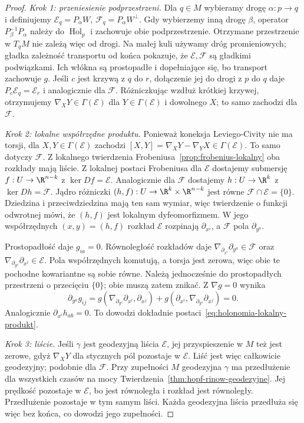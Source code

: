 \begin{proof}
\emph{Krok 1: przeniesienie podprzestrzeni.}
Dla $q\in M$ wybieramy drogę $\alpha:p\to q$ i
definiujemy $\mathcal E_q=P_\alpha W$,
$\mathcal F_q=P_\alpha W^\perp$. Gdy wybierzemy inną
drogę $\beta$, operator $P_\beta^{-1}P_\alpha$
należy do $\operatorname{Hol}_p$ i zachowuje obie
podprzestrzenie. Otrzymane przestrzenie w $T_qM$
nie zależą więc od drogi. Na małej kuli używamy dróg
promieniowych; gładka zależność transportu od końca
pokazuje, że $\mathcal E,\mathcal F$ są gładkimi
podwiązkami. Ich włókna są prostopadłe i dopełniające się,
bo transport zachowuje $g$. Jeśli $c$ jest krzywą
z $q$ do $r$, dołączenie jej do drogi z $p$ do $q$
daje $P_c\mathcal E_q=\mathcal E_r$ i analogicznie
dla $\mathcal F$. Różniczkując wzdłuż krótkiej krzywej,
otrzymujemy $\nabla_XY\in\Gamma(\mathcal E)$ dla
$Y\in\Gamma(\mathcal E)$ i dowolnego $X$; to samo
zachodzi dla $\mathcal F$.

\emph{Krok 2: lokalne współrzędne produktu.}
Ponieważ koneksja Leviego-Civity nie ma torsji,
dla $X,Y\in\Gamma(\mathcal E)$ zachodzi
$[X,Y]=\nabla_XY-\nabla_YX\in\Gamma(\mathcal E)$.
To samo dotyczy $\mathcal F$. Z lokalnego twierdzenia
Frobeniusa~\ref{prop:frobenius-lokalny} oba rozkłady
mają liście. Z lokalnej postaci Frobeniusa dla
$\mathcal E$ dostajemy submersję
$f:U\to\R^{n-k}$ z $\ker Df=\mathcal E$.
Analogicznie dla $\mathcal F$ dostajemy
$h:U\to\R^k$ z $\ker Dh=\mathcal F$.
Jądro różniczki $(h,f):U\to\R^k\times\R^{n-k}$
jest równe $\mathcal F\cap\mathcal E=\{0\}$.
Dziedzina i przeciwdziedzina mają ten sam wymiar,
więc twierdzenie o funkcji odwrotnej mówi, że $(h,f)$
jest lokalnym dyfeomorfizmem. W jego współrzędnych
$(x,y)=(h,f)$ rozkład $\mathcal E$ rozpinają
$\partial_{x^i}$, a $\mathcal F$ pola $\partial_{y^a}$.

Prostopadłość daje $g_{ia}=0$. Równoległość rozkładów
daje $\nabla_{\partial_{x^i}}\partial_{y^a}\in\mathcal F$
oraz $\nabla_{\partial_{y^a}}\partial_{x^i}\in\mathcal E$.
Pola współrzędnych komutują, a torsja jest zerowa, więc
obie te pochodne kowariantne są sobie równe. Należą
jednocześnie do prostopadłych przestrzeni o przecięciu
$\{0\}$; obie muszą zatem znikać. Z $\nabla g=0$ wynika
\[
 \partial_{y^a}g_{ij}
 =g(\nabla_{\partial_{y^a}}\partial_{x^i},
                         \partial_{x^j})
  +g(\partial_{x^i},
     \nabla_{\partial_{y^a}}\partial_{x^j})=0.
\]
Analogicznie $\partial_{x^i}h_{ab}=0$.
To dowodzi dokładnie postaci~\eqref{eq:holonomia-lokalny-produkt}.

\emph{Krok 3: liście.} Jeśli $\gamma$ jest geodezyjną
liścia $\mathcal E$, jej przyspieszenie w $M$ też jest
zerowe, gdyż $\nabla_XY$ dla stycznych pól pozostaje
w $\mathcal E$. Liść jest więc całkowicie geodezyjny;
podobnie dla $\mathcal F$. Przy zupełności $M$
geodezyjna $\gamma$ ma przedłużenie dla wszystkich
czasów na mocy Twierdzenia~\ref{thm:hopf-rinow-geodezyjne}.
Jej prędkość pozostaje w $\mathcal E$, bo jest
równoległa i rozkład jest równoległy. Przedłużenie
pozostaje w tym samym liści. Każda geodezyjna liścia
przedłuża się więc bez końca, co dowodzi jego zupełności.
\end{proof}


